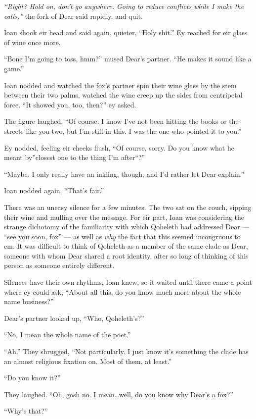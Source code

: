 \emph{``Right? Hold on, don't go anywhere. Going to reduce conflicts while I make the calls,''} the fork of Dear said rapidly, and quit.

Ioan shook eir head and said again, quieter, ``Holy shit.'' Ey reached for eir glass of wine once more.

``Bone I'm going to toss, hmm?'' mused Dear's partner. ``He makes it sound like a game.''

Ioan nodded and watched the fox's partner spin their wine glass by the stem between their two palms, watched the wine creep up the sides from centripetal force. ``It showed you, too, then?'' ey asked.

The figure laughed, ``Of course. I know I've not been hitting the books or the streets like you two, but I'm still in this. I was the one who pointed it to you.''

Ey nodded, feeling eir cheeks flush, ``Of course, sorry. Do you know what he meant by''closest one to the thing I'm after``?''

``Maybe. I only really have an inkling, though, and I'd rather let Dear explain.''

Ioan nodded again, ``That's fair.''

There was an uneasy silence for a few minutes. The two sat on the couch, sipping their wine and mulling over the message. For eir part, Ioan was considering the strange dichotomy of the familiarity with which Qoheleth had addressed Dear --- ``see you soon, fox'' --- as well as \emph{why} the fact that this seemed incongruous to em. It was difficult to think of Qoheleth as a member of the same clade as Dear, someone with whom Dear shared a root identity, after so long of thinking of this person as someone entirely different.

Silences have their own rhythms, Ioan knew, so it waited until there came a point where ey could ask, ``About all this, do you know much more about the whole name business?''

Dear's partner looked up, ``Who, Qoheleth's?''

``No, I mean the whole name of the poet.''

``Ah.'' They shrugged, ``Not particularly. I just know it's something the clade has an almost religious fixation on. Most of them, at least.''

``Do you know it?''

They laughed. ``Oh, gosh no. I mean\ldots{}well, do you know why Dear's a fox?''

``Why's that?''

